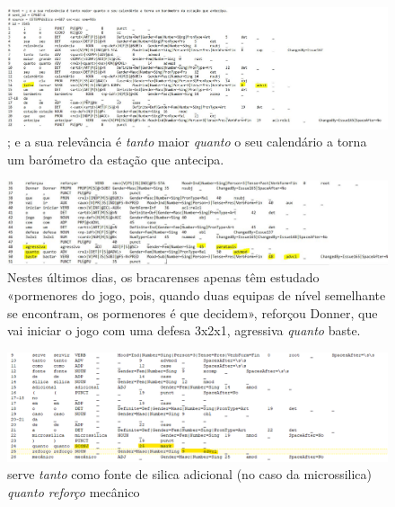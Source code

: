 \documentclass[output=paper,colorlinks,citecolor=brown]{langscibook}
\begin{document}
	\begin{figure}[H]
	    \centering
	    \includegraphics[width=\textwidth,height=\textheight,keepaspectratio]{imagesDrive/image13.png}
	    \caption{; e a sua relevância é \emph{tanto} maior \emph{quanto} o seu calendário a torna um barómetro da estação que antecipa.}
	    \label{fig:comparative13}
	\end{figure}{}

	\begin{figure}[H]
	    \centering
	    \includegraphics[width=\textwidth,height=\textheight,keepaspectratio]{imagesDrive/image5.png}
	    \caption{Nestes últimos dias, os bracarenses apenas têm estudado «pormenores do jogo, pois, quando duas equipas de nível semelhante se encontram, os pormenores é que decidem», reforçou Donner, que vai iniciar o jogo com uma defesa 3x2x1, agressiva \emph{quanto} baste.}
	    \label{fig:comparative14}
	\end{figure}{}

	\begin{figure}[H]
	    \centering
	    \includegraphics[width=\textwidth,height=\textheight,keepaspectratio]{imagesDrive/tantoquanto.png}
	    \caption{serve \emph{tanto} como fonte de silica adicional (no caso da microssilica)\emph{ quanto reforço} mecânico}
	    \label{fig:tantoquanto}
	\end{figure}{}
\end{document}
